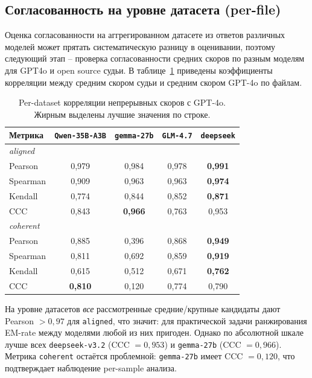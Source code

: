 \documentclass[a4paper,12pt]{extarticle}
\begin{document}
\subsection{Согласованность на уровне датасета (per-file)}

Оценка согласованности на аггрегированном датасете из ответов различных моделей может прятать систематическую разницу в оценивании, поэтому следующий этап -- проверка согласованности средних скоров по разным моделям для GPT4o и open source судьи. В таблице~\ref{tab:per_file} приведены коэффициенты корреляции между средним скором судьи и средним скором GPT-4o по файлам.

\begin{table}[ht]
\caption{Per-dataset корреляции непрерывных скоров с GPT-4o. Жирным выделены лучшие значения по строке.}
\label{tab:per_file}
\footnotesize
\centering
\begin{tabular}{lcccc}
\toprule
\textbf{Метрика} & \texttt{Qwen-35B-A3B} & \texttt{gemma-27b} & \texttt{GLM-4.7} & \texttt{deepseek} \\
\midrule
\multicolumn{5}{l}{\emph{aligned}} \\
Pearson    & 0{,}979 & 0{,}984 & 0{,}978 & \textbf{0{,}991} \\
Spearman   & 0{,}909 & 0{,}963 & 0{,}963 & \textbf{0{,}974} \\
Kendall    & 0{,}774 & 0{,}844 & 0{,}852 & \textbf{0{,}871} \\
CCC        & 0{,}843 & \textbf{0{,}966} & 0{,}763 & 0{,}953 \\
\midrule
\multicolumn{5}{l}{\emph{coherent}} \\
Pearson    & 0{,}885 & 0{,}396 & 0{,}868 & \textbf{0{,}949} \\
Spearman   & 0{,}811 & 0{,}692 & 0{,}859 & \textbf{0{,}919} \\
Kendall    & 0{,}615 & 0{,}512 & 0{,}671 & \textbf{0{,}762} \\
CCC        & \textbf{0{,}810} & 0{,}120 & 0{,}774 & 0{,}790 \\
\bottomrule
\end{tabular}
\end{table}

На уровне датасетов \emph{все} рассмотренные средние/крупные кандидаты дают Pearson $> 0{,}97$ для \texttt{aligned}, что значит: для практической задачи ранжирования EM-rate между моделями любой из них пригоден. Однако по абсолютной шкале лучше всех \texttt{deepseek-v3.2} (CCC $= 0{,}953$) и \texttt{gemma-27b} (CCC $= 0{,}966$). Метрика \texttt{coherent} остаётся проблемной: \texttt{gemma-27b} имеет CCC $= 0{,}120$, что подтверждает наблюдение per-sample анализа.
\end{document}
